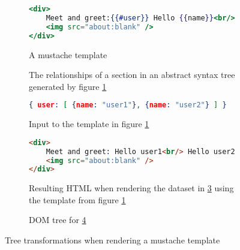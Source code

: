 \documentclass[thesis.tex]{subfiles}
\begin{document}
\begin{figure}
	\centering
	\begin{subfigure}{\linewidth}
		\caption{A mustache template}
		\label{fig:relationships.mustache}
		\begin{lstlisting}[language=mustache]
<div>
	Meet and greet:{{#user}} Hello {{name}}<br/>{{/user}}
	<img src="about:blank" />
</div>
		\end{lstlisting}
	\end{subfigure}
	
	\begin{subfigure}{\linewidth}
		\caption{The relationships of a section in an abstract syntax tree generated
		         by figure \ref{fig:relationships.mustache}}
		\label{fig:relationships.ast}
		\resizebox{\linewidth}{!}{}
	\end{subfigure}
	
	\begin{subfigure}{\linewidth}
		\caption{Input to the template in figure \ref{fig:relationships.mustache}}
		\label{fig:rendered.json}
		\begin{lstlisting}[language=JSON]
{ user: [ {name: "user1"}, {name: "user2"} ] }
		\end{lstlisting}
	\end{subfigure}
	
	\begin{subfigure}{\linewidth}
		\caption{Resulting HTML when rendering the dataset in \ref{fig:rendered.json}
		         using the template from figure \ref{fig:relationships.mustache}}
		\label{fig:rendered.html}
		\begin{lstlisting}[language=HTML]
<div>
	Meet and greet: Hello user1<br/> Hello user2<br/>
	<img src="about:blank" />
</div>
		\end{lstlisting}
	\end{subfigure}
	
	\begin{subfigure}{\linewidth}
		\caption{DOM tree for \ref{fig:rendered.html}}
		\label{fig:rendered.ast}
		\resizebox{\linewidth}{!}{}
	\end{subfigure}
	\caption{Tree transformations when rendering a mustache template}
	\label{fig:rendered}
\end{figure}
\end{document}
